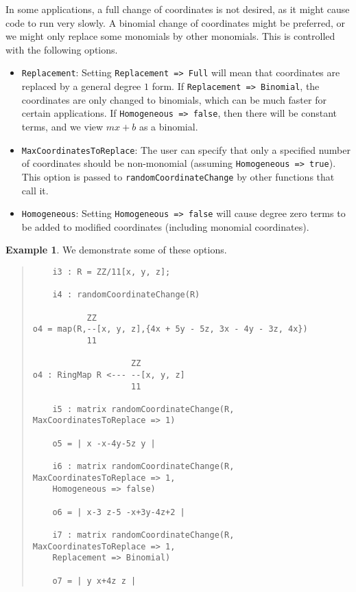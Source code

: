 \documentclass[11pt]{amsart}
\theoremstyle{definition}
\newtheorem{example}{Example}[section]
\begin{document}
In some applications, a full change of coordinates is not desired, as it might cause code to run very slowly.  A binomial change of coordinates might be preferred, or we might only replace some monomials by other monomials.  
This is controlled with the following options.

\begin{itemize}
\item {\tt Replacement}: Setting {\tt Replacement => Full} will mean that coordinates are replaced by a general degree $1$ form.  If {\tt Replacement => Binomial}, the coordinates are only changed to binomials, which can be much faster for certain applications. If {\tt Homogeneous => false}, then there will be constant terms, and we view $mx + b$ as a binomial.
\item {\tt MaxCoordinatesToReplace}: The user can specify that only a specified number of coordinates should be non-monomial (assuming {\tt Homogeneous => true}).  
  This option is passed to {\tt randomCoordinateChange} by other functions that call it. 		
\item {\tt Homogeneous}:  Setting {\tt Homogeneous => false} will cause degree zero terms to be added to modified coordinates (including monomial coordinates).		
\end{itemize} 
\begin{example}  We demonstrate some of these options.
%
  {{\small\color{blue}
  \begin{quote}
\begin{verbatim}
	i3 : R = ZZ/11[x, y, z];
	
	i4 : randomCoordinateChange(R)
	
           ZZ
o4 = map(R,--[x, y, z],{4x + 5y - 5z, 3x - 4y - 3z, 4x})                     
           11
           
                    ZZ
o4 : RingMap R <--- --[x, y, z]
                    11
                    
	i5 : matrix randomCoordinateChange(R, MaxCoordinatesToReplace => 1)
	
	o5 = | x -x-4y-5z y |
	
	i6 : matrix randomCoordinateChange(R, MaxCoordinatesToReplace => 1, 
	Homogeneous => false)
	
	o6 = | x-3 z-5 -x+3y-4z+2 |
	
	i7 : matrix randomCoordinateChange(R, MaxCoordinatesToReplace => 1, 
	Replacement => Binomial)
	
	o7 = | y x+4z z |
\end{verbatim}
\end{quote}
    }}
  
\end{example}
\end{document}
